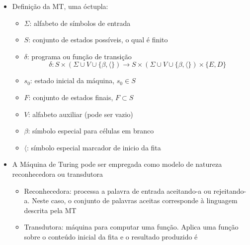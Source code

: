 \documentclass[12pt]{article}
\begin{document}
\begin{itemize}
\begin{itemize}
        MT se encontra
        \item O processamento cessa quando a máquina atinge uma configuração 
        para a qual não existe função prevista, neste caso
        \begin{itemize}
            \item Se a máquina estiver com um estado final ativo, a cadeia de 
            entrada é aceita
            \item Se o estado ativo não for final, a cadeia de entrada não é 
            aceita
            \item Se a máquina não parar (looping), a cadeia de entrada não é 
            aceita
        \end{itemize}
    \end{itemize}
    \item Definição da MT, uma óctupla:
    \begin{itemize}
        \item $\Sigma$: alfabeto de símbolos de entrada
        \item $S$: conjunto de estados possíveis, o qual é finito
        \item $\delta$: programa ou função de transição
        \[
        \delta: S \times(\Sigma \cup V \cup \{\beta,\langle\}) \rightarrow 
        S \times(\Sigma \cup V \cup \{\beta,\langle\}) \times \{E,D\}
        \]
        \item $s_0$: estado inicial da máquina, $s_0 \in S$
        \item $F$: conjunto de estados finais, $F \subset S$
        \item $V$: alfabeto auxiliar (pode ser vazio)
        \item $\beta$: símbolo especial para células em branco
        \item $\langle$: símbolo especial marcador de inicio da fita
    \end{itemize}
    \item A Máquina de Turing pode ser empregada como modelo de natureza 
    reconhecedora ou transdutora
    \begin{itemize}
        \item Reconhecedora: processa a palavra de entrada aceitando-a ou 
        rejeitando-a. Neste caso, o conjunto de palavras aceitas corresponde 
        à linguagem descrita pela MT
        \item Transdutora: máquina para computar uma função. Aplica uma 
        função sobre o conteúdo inicial da fita e o resultado produzido é 

\end{itemize}
\end{itemize}
\end{document}
